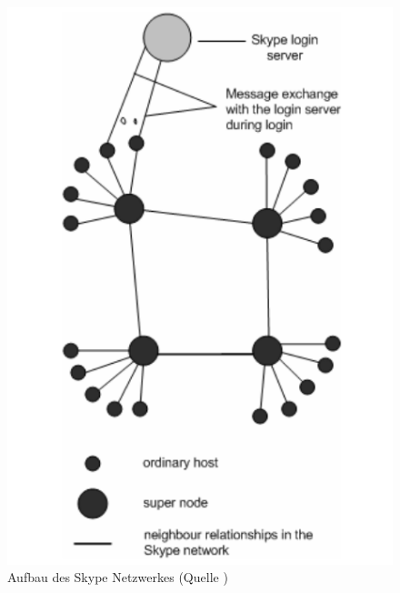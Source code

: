 \begin{figure}
\includegraphics[scale=0.5]{gfx/skypeAufbau}
\caption{Aufbau des Skype Netzwerkes (Quelle \cite{skypeAna})}
\label{fig:skypeAufbau}
\end{figure}